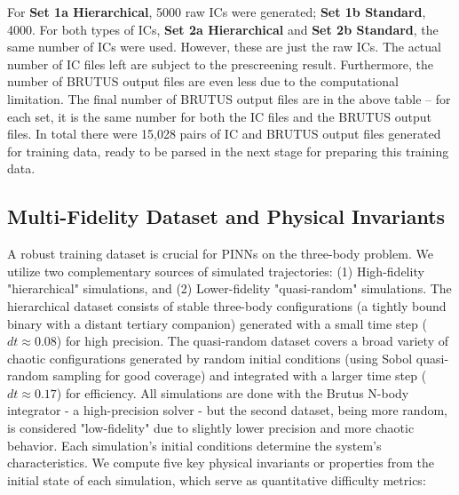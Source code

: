 \documentclass{article}
\begin{document}
For \textbf{Set 1a Hierarchical}, 5000 raw ICs were generated; \textbf{Set 1b Standard}, 4000. For both types of ICs, \textbf{Set 2a Hierarchical} and \textbf{Set 2b Standard}, the same number of ICs were used.
However, these are just the raw ICs. The actual number of IC files left are subject to the prescreening result.
Furthermore, the number of BRUTUS output files are even less due to the computational limitation. The final number of BRUTUS output files are in the above table – for each set,
it is the same number for both the IC files and the BRUTUS output files. In total there were 15,028 pairs of IC and BRUTUS output files generated for training data,
ready to be parsed in the next stage for preparing this training data.


\subsection{Multi-Fidelity Dataset and Physical Invariants}

A robust training dataset is crucial for PINNs on the three-body problem.  We utilize two complementary sources of simulated trajectories: (1) High-fidelity "hierarchical" simulations, and (2) Lower-fidelity "quasi-random" simulations.  The hierarchical dataset consists of stable three-body configurations (a tightly bound binary with a distant tertiary companion) generated with a small time step ($dt \approx 0.08$) for high precision.  The quasi-random dataset covers a broad variety of chaotic configurations generated by random initial conditions (using Sobol quasi-random sampling for good coverage) and integrated with a larger time step ($dt \approx 0.17$) for efficiency.  All simulations are done with the Brutus N-body integrator - a high-precision solver - but the second dataset, being more random, is considered "low-fidelity" due to slightly lower precision and more chaotic behavior.  Each simulation's initial conditions determine the system's characteristics. We compute five key physical invariants or properties from the initial state of each simulation, which serve as quantitative difficulty metrics: 
\end{document}
